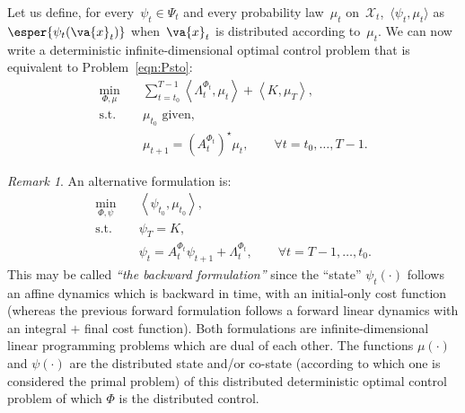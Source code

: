 \documentclass[a4paper]{amsart}
\theoremstyle{plain}
\theoremstyle{definition}
\theoremstyle{remark}
\newtheorem{remark}{Remark}
\begin{document}
Let us define, for every~$\psi_t \in \Psi_t$ and every probability
law~$\mu_t$ on~$\mathcal{X}_t$,~$\langle \psi_t, \mu_t \rangle$
as~$\esper{\psi_t(\va{x}_t)}$ when~$\va{x}_t$ is distributed
according to~$\mu_t$. We can now write a deterministic
infinite-dimensional optimal control problem that is equivalent to
Problem~\eqref{eqn:Psto}:
\begin{align*}
\min_{\Phi, \mu} \quad& \sum_{t=t_0}^{T-1} \left\langle
\Lambda_t^{\Phi_t}, \mu_t \right\rangle +
\left\langle K, \mu_T \right\rangle, \\
\text{s.t.} \quad& \mu_{t_0} \text{ given}, \\
& \mu_{t+1} = \left(A_t^{\Phi_t}\right)^\star \mu_t, \qquad
\forall t=t_0, \dots, T-1.
\end{align*}
\begin{remark}
An alternative formulation is:
\begin{align*}
\min_{\Phi, \psi} \quad&
\left\langle \psi_{t_{0}}, \mu_{t_{0}} \right\rangle, \\
\text{s.t.} \quad& \psi_{T}=K, \\
& \psi_{t} = A_t^{\Phi_t}\psi_{t+1}+\Lambda_t^{\Phi_t}, \qquad
\forall t=T-1,\dots,t_0 .
\end{align*}
This may be called \emph{``the backward formulation''} since the
``state'' \(\psi_{t}(\cdot)\) follows an affine dynamics which is
backward in time, with an initial-only cost function (whereas the
previous forward formulation follows a forward linear dynamics
with an integral \(+\) final cost function). Both formulations are
infinite-dimensional linear programming problems which are dual of
each other. The functions \(\mu(\cdot)\) and \(\psi(\cdot)\) are
the distributed state and/or co-state (according to which one is
considered the primal problem) of this distributed deterministic
optimal control problem of which \(\Phi\) is the distributed
control.
\end{remark}
\end{document}
